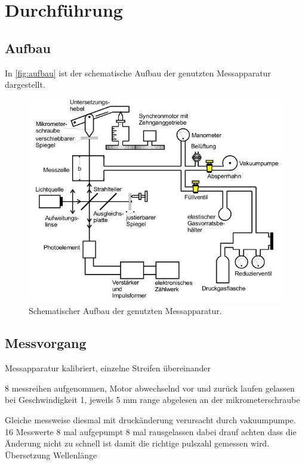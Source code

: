 \section{Durchführung}
\label{sec:Durchführung}
\subsection{Aufbau}

In \autoref{fig:aufbau} ist der schematische Aufbau der genutzten Messapparatur dargestellt. 
\begin{figure}[H]
\centering
\includegraphics[width=\textwidth]{graphics/aufbau.JPG}
\caption{Schematischer Aufbau der genutzten Messapparatur. \cite{anleitung}}
\label{fig:aufbau}
\end{figure}

\subsection{Messvorgang}
Messapparatur kalibriert, einzelne Streifen übereinander

8 messreihen aufgenommen, Motor abwechselnd vor und zurück laufen gelassen
bei Geschwindigkeit 1, jeweils 5 mm range abgelesen an der
mikrometerschraube

Gleiche messweise diesmal mit druckänderung verursacht durch vakuumpumpe.
16 Messwerte 8 mal aufgepumpt 8 mal rausgelassen dabei drauf achten dass
die Änderung nicht zu schnell ist damit die richtige pulszahl gemessen
wird.
Übersetzung Wellenlänge
